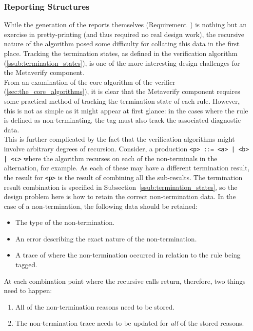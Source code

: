 
\subsubsection{Reporting Structures} %
\label{ssub:reporting_structures}
While the generation of the reports themselves (Requirement~) is nothing but an exercise in pretty-printing (and thus required no real design work), the recursive nature of the algorithm posed some difficulty for collating this data in the first place. 
Tracking the termination states, as defined in the verification algorithm (\autoref{ssub:termination_states}), is one of the more interesting design challenges for the Metaverify component.\\

From an examination of the core algorithm of the verifier (\autoref{sec:the_core_algorithms}), it is clear that the Metaverify component requires some practical method of tracking the termination state of each rule. 
However, this is not as simple as it might appear at first glance: in the cases where the rule is defined as non-terminating, the tag must also track the associated diagnostic data. \\

This is further complicated by the fact that the verification algorithms might involve arbitrary degrees of recursion. 
Consider, a production \texttt{<p> ::= <a> | <b> | <c>} where the algorithm recurses on each of the non-terminals in the alternation, for example. 
As each of these may have a different termination result, the result for \texttt{<p>} is the result of combining all the sub-results. 
The termination result combination is specified in Subsection~\ref{ssub:termination_states}, so the design problem here is how to retain the correct non-termination data. 
In the case of a non-termination, the following data should be retained:
\begin{itemize}
    \item The type of the non-termination.
    \item An error describing the exact nature of the non-termination.
    \item A trace of where the non-termination occurred in relation to the rule being tagged. 
\end{itemize}

At each combination point where the recursive calls return, therefore, two things need to happen:
\begin{enumerate}
    \item All of the non-termination reasons need to be stored.
    \item The non-termination trace needs to be updated for \textit{all} of the stored reasons. 
\end{enumerate}

